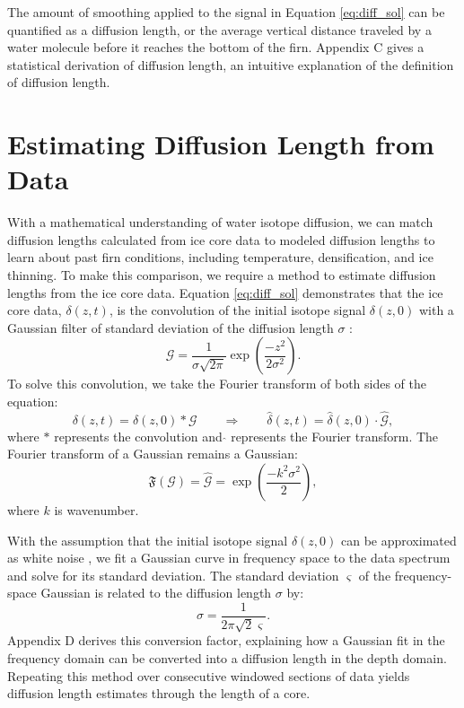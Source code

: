 \documentclass[draft, jgrga]{AGUTeX}
\begin{document}
\begin{article}
The amount of smoothing applied to the signal in Equation \ref{eq:diff_sol} can be quantified as a diffusion length, or the average vertical distance traveled by a water molecule before it reaches the bottom of the firn. Appendix C gives a statistical derivation of diffusion length, an intuitive explanation of the definition of diffusion length.


\section{Estimating Diffusion Length from Data}

With a mathematical understanding of water isotope diffusion, we can match diffusion lengths calculated from ice core data to modeled diffusion lengths to learn about past firn conditions, including temperature, densification, and ice thinning. To make this comparison, we require a method to estimate diffusion lengths from the ice core data. Equation \ref{eq:diff_sol} demonstrates that the ice core data, $\delta(z,t)$, is the convolution of the initial isotope signal $\delta(z,0)$ with a Gaussian filter of standard deviation of the diffusion length $\sigma$ \citep{Johnsen2000}:
\begin{equation}
\mathcal{G} = \frac{1}{\sigma \sqrt{2\pi}} \exp \left( \frac{-z^2}{2\sigma^2} \right).
\end{equation}
To solve this convolution, we take the Fourier transform of both sides of the equation:
\begin{equation}
  \delta(z,t) = \delta(z,0)*\mathcal{G} \qquad \Rightarrow \qquad \hat{\delta}(z,t) = \hat{\delta}(z,0) \cdot \hat{\mathcal{G}},
\end{equation}
where $*$ represents the convolution and \quad $\hat{}$ \quad represents the Fourier transform. The Fourier transform of a Gaussian remains a Gaussian:
\begin{equation}
\mathfrak{F}(\mathcal{G}) = \hat{\mathcal{G}} = \exp \left( \frac{-k^2\sigma^2}{2} \right),
\end{equation}
where $k$ is wavenumber.

With the assumption that the initial isotope signal $\delta(z,0)$ can be approximated as white noise \citep{Gkinis2014}, we fit a Gaussian curve in frequency space to the data spectrum and solve for its standard deviation. The standard deviation $\varsigma$ of the frequency-space Gaussian is related to the diffusion length $\sigma$ by:
\begin{equation}
  \sigma = \frac{1}{2\pi\sqrt{2}\varsigma}.
\end{equation}
Appendix D derives this conversion factor, explaining how a Gaussian fit in the frequency domain can be converted into a diffusion length in the depth domain. Repeating this method over consecutive windowed sections of data yields diffusion length estimates through the length of a core.


\end{article}
\end{document}
